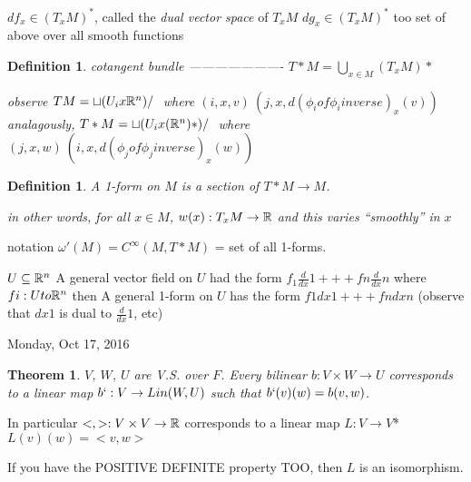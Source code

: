 \documentclass[11pt,leqno,oneside]{amsart}
\newcommand{\x}{\times}
\theoremstyle{mystyle} \newtheorem{thrm}[thm]{Theorem}
\theoremstyle{mystyle} \newtheorem{defi}[thm]{Definition}
\begin{document}
$df_x \in (T_xM)^*$, called the \emph{dual vector space} of $T_xM$
$dg_x \in (T_xM)^*$ too
set of above over all smooth functions

\begin{defi}
	cotangent bundle
	----------------------
	$T*M = \bigcup_{x \in M} (T_xM)*$


	observe
	$TM = \sqcup (U_i x {\mathbb R}^n)/~$
	where $(i, x, v) ~ (j, x, d(\phi_i of \phi_i inverse)_x(v))$
	analagously,
	$T*M = \sqcup (U_i x ({\mathbb R}^n)*)/~$
	where $(j, x, w) ~ (i, x, d(\phi_j of \phi_j inverse)_x(w))$
\end{defi}
\begin{defi}
	A \emph{1-form} on $M$ is a section of $T*M \to M$.

	in other words, for all $x \in M$, $w(x): T_xM \to {\mathbb R}$ and this varies ``smoothly'' in $x$
\end{defi}
	notation
	$\omega'(M) = C^\infty(M, T*M)$ = set of all 1-forms.

\begin{example}
	$U \subseteq {\mathbb R}^n$
	A general vector field on $U$ had the form
	$f_1 \frac{d}{dx}1 +++ fn \frac{d}{dx}n$
	where $fi : U to {\mathbb R}^n$
	then
	A general 1-form on $U$ has the form
	$f1 dx1 +++ fn dxn$
	(observe that $dx1$ is dual to $\frac{d}{dx}1$, etc)
\end{example}
Monday, Oct 17, 2016

\begin{thrm}
	$V$, $W$, $U$ are V.S. over $F$.  Every bilinear $b:V \x W \to U$ corresponds to a linear map $b` : V \to Lin(W,U)$
	such that $b`(v)(w) = b(v,w)$.
\end{thrm}
	In particular $<,> : V \x V \to \R$
	corresponds to a linear map
	$L: V \to V$*
	$L(v)(w) = <v,w>$

	If you have the POSITIVE DEFINITE property TOO, then $L$ is an isomorphism.
\end{document}
